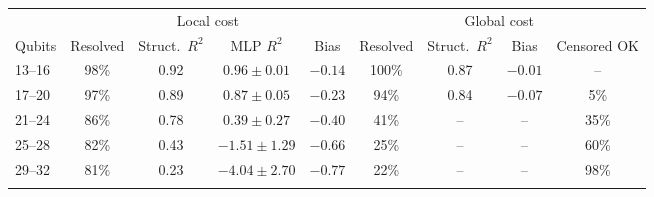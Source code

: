 \begin{tabular}{lcccccccc}
\toprule
 & \multicolumn{4}{c}{Local cost} & \multicolumn{4}{c}{Global cost} \\
\cmidrule(lr){2-5}\cmidrule(lr){6-9}
Qubits & Resolved & Struct.~$R^2$ & MLP $R^2$ & Bias & Resolved & Struct.~$R^2$ & Bias & Censored OK \\
\midrule
13--16 & 98\% & 0.92 & $0.96 \pm 0.01$ & $-0.14$ & 100\% & 0.87 & $-0.01$ & -- \\
17--20 & 97\% & 0.89 & $0.87 \pm 0.05$ & $-0.23$ & 94\% & 0.84 & $-0.07$ & 5\% \\
21--24 & 86\% & 0.78 & $0.39 \pm 0.27$ & $-0.40$ & 41\% & -- & -- & 35\% \\
25--28 & 82\% & 0.43 & $-1.51 \pm 1.29$ & $-0.66$ & 25\% & -- & -- & 60\% \\
29--32 & 81\% & 0.23 & $-4.04 \pm 2.70$ & $-0.77$ & 22\% & -- & -- & 98\% \\
\botrule
\end{tabular}
